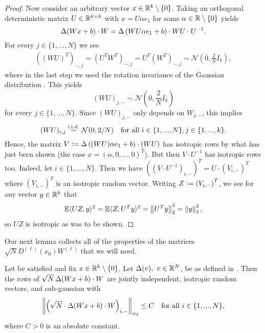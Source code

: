 \begin{proof}
Now consider an arbitrary vector $x \in \mathbb{R}^k \setminus \{0\}$. 
Taking an orthogonal deterministic matrix $U \in \mathbb{R}^{k \times k}$ with $x =  U\alpha e_1$ for some $\alpha \in \mathbb{R} \setminus \{0\}$ yields
\begin{equation*}
    \operatorname{\Delta}(Wx + b) \cdot W = \operatorname{\Delta}\left(WU\alpha e_1 + b\right) \cdot WU \cdot U^{-1}.
\end{equation*}
For every $j \in \{1,...,N\}$ we see
\begin{align*}
\left((WU)^T\right)_{-,j} = \left(U^T W^T\right)_{-,j} = U^T \left(W^T \right)_{-,j } \sim \mathcal{N}\left(0, \frac{2}{N}I_k \right),
\end{align*}
where in the last step we used the rotation invariance of the Gaussian distribution \cite[Proposition 3.3.2]{vershynin_high-dimensional_2018}. This yields
\begin{equation*}
(WU)_{j,-} \sim \mathcal{N}\left(0, \frac{2}{N}I_k\right)
\end{equation*}
for every $j \in \{1,...,N\}$. Since $(WU)_{j,-}$ only depends on $W_{j,-}$, this implies
\begin{equation*}
(WU)_{i,j} \overset{\mathrm{i.i.d.}}{\sim} \mathcal{N}(0, 2/N) \quad \text{for all } i \in \{1,...,N\}, j \in \{1,...,k\}.
\end{equation*}
Hence, the matrix $V \mathrel{\mathop:}= \operatorname{\Delta}\left((WU) \alpha e_1 + b \right) \cdot (WU)$ has isotropic rows by what has just been shown (the case $x = (\alpha, 0, ..., 0)^T$).
But then $V \cdot U^{-1}$ has isotropic rows too. Indeed, let $i \in \{1,...,N\}$. Then we have $\left(\left(V \cdot U^{-1}\right)_{i,-}\right)^T = U \cdot \left(V_{i,-}\right)^T$ where $\left(V_{i,-}\right)^T$ is an isotropic random vector. Writing $Z \mathrel{\mathop:}= \left(V_{i,-}\right)^T$, we see for any vector $ y \in \mathbb{R}^k$ that
\begin{equation*}
    \mathbb{E} \langle UZ , y \rangle^2= \mathbb{E} \langle Z, U^T y \rangle^2 = \left\Vert U^T y \right\Vert_2^2 = \left\Vert y \right\Vert_2 ^2,
\end{equation*}
so $UZ$ is isotropic as was to be shown.
\end{proof}
Our next lemma collects all of the properties of the matrices $\sqrt{N}D^{(\ell)}(x_0) W^{(\ell)}$ that we will need. 
\begin{lemma} \label{thm: dev_conditions}
    Let  be satisfied and fix $x \in \mathbb{R}^k \setminus \{0\}$. Let $\Delta(v), \ v\in \RR^N$, be as defined in . Then the rows of $\sqrt{N} \operatorname{\Delta}(Wx + b) \cdot W$ are jointly independent, isotropic random vectors, and sub-gaussian with
    \begin{equation*}
        \left\Vert \left(\sqrt{N} \cdot \operatorname{\Delta}(Wx + b) \cdot W\right)_{i,-}\right\Vert_{\psi_2} \leq C \quad \text{for all } i \in \{1,...,N\},
    \end{equation*}
    where $C>0$ is an absolute constant. 
\end{lemma}
